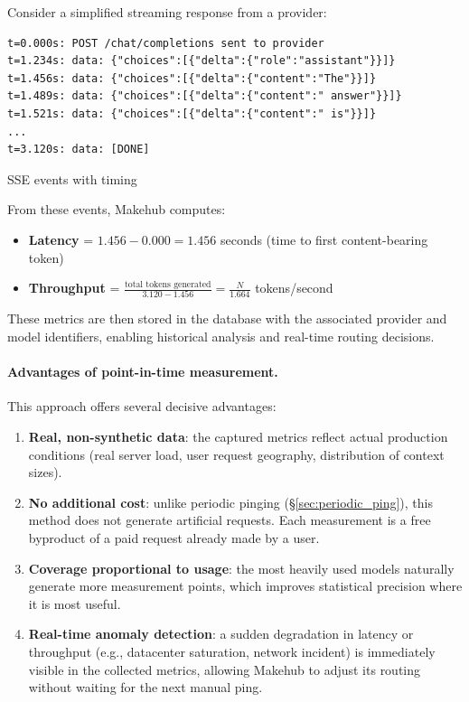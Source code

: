 \documentclass[english]{article}
\begin{document}
Consider a simplified streaming response from a provider:

\begin{listing}[H]
\begin{verbatim}
t=0.000s: POST /chat/completions sent to provider
t=1.234s: data: {"choices":[{"delta":{"role":"assistant"}}]}
t=1.456s: data: {"choices":[{"delta":{"content":"The"}}]}
t=1.489s: data: {"choices":[{"delta":{"content":" answer"}}]}
t=1.521s: data: {"choices":[{"delta":{"content":" is"}}]}
...
t=3.120s: data: [DONE]
\end{verbatim}
\caption{SSE events with timing}
\end{listing}

From these events, Makehub computes:
\begin{itemize}
    \item \textbf{Latency} = $1.456 - 0.000 = 1.456$ seconds (time to first content-bearing token)
    \item \textbf{Throughput} = $\frac{\text{total tokens generated}}{3.120 - 1.456} = \frac{N}{1.664}$ tokens/second
\end{itemize}

These metrics are then stored in the database with the associated provider and model identifiers, enabling historical analysis and real-time routing decisions.

\paragraph{Advantages of point-in-time measurement.}

This approach offers several decisive advantages:
\begin{enumerate}
    \item \textbf{Real, non-synthetic data}: the captured metrics reflect actual production conditions (real server load, user request geography, distribution of context sizes).

    \item \textbf{No additional cost}: unlike periodic pinging (\S\ref{sec:periodic_ping}), this method does not generate artificial requests. Each measurement is a free byproduct of a paid request already made by a user.

    \item \textbf{Coverage proportional to usage}: the most heavily used models naturally generate more measurement points, which improves statistical precision where it is most useful.

    \item \textbf{Real-time anomaly detection}: a sudden degradation in latency or throughput (e.g., datacenter saturation, network incident) is immediately visible in the collected metrics, allowing Makehub to adjust its routing without waiting for the next manual ping.
\end{enumerate}
\end{document}
